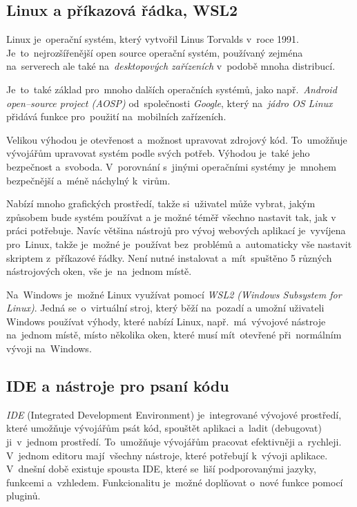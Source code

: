 \documentclass[10pt,a4paper]{article}
\begin{document}
        \subsection{Linux a příkazová řádka, WSL2}
        Linux je~operační systém, který vytvořil Linus Torvalds v~roce 1991. Je~to~nejrozšířenější open source operační systém, používaný zejména na~serverech ale také na~\emph{desktopových zařízeních} v~podobě mnoha distribucí.
        
        Je~to~také základ pro~mnoho dalších operačních systémů, jako např.~\emph{Android open--source project (\emph{AOSP})} od~společnosti \emph{Google}, který na~\emph{jádro OS Linux} přidává funkce pro~použití na~mobilních zařízeních. \cite{AOSP:linux}
        
        Velikou výhodou je otevřenost a~možnost upravovat zdrojový kód. To~umožňuje vývojářům upravovat systém podle svých potřeb. Výhodou je~také jeho bezpečnost a~svoboda. V~porovnání s~jinými operačními systémy je~mnohem bezpečnější a~méně náchylný k~virům. \cite{medium:LinuxSecure}

        Nabízí mnoho grafických prostředí, takže si~uživatel může vybrat, jakým způsobem bude systém používat a je možné téměř
        všechno nastavit tak, jak v práci potřebuje. Navíc většina nástrojů pro vývoj webových aplikací je~vyvíjena pro~Linux, takže je~možné je~používat bez~problémů a~automaticky vše nastavit skriptem z~příkazové řádky. Není nutné instalovat a~mít~spuštěno 5 různých nástrojových oken, vše je~na~jednom místě.

        Na~Windows je~možné Linux využívat pomocí \emph{WSL2 (Windows Subsystem for Linux)}. Jedná se~o~virtuální stroj, který běží na~pozadí a umožní uživateli Windows používat výhody, které nabízí Linux, např.~má~vývojové nástroje na~jednom místě, místo několika oken, které musí mít~otevřené při~normálním vývoji na~Windows.

        \subsection{IDE a nástroje pro psaní kódu}
        \emph{IDE} (Integrated Development Environment) je~integrované vývojové prostředí, které umožňuje vývojářům psát kód, spouštět aplikaci a~ladit (debugovat) ji~v~jednom prostředí. To~umožňuje vývojářům pracovat efektivněji a~rychleji. V~jednom editoru mají~všechny nástroje, které potřebují k~vývoji aplikace. V~dnešní době existuje spousta IDE, které se~liší podporovanými jazyky, funkcemi a~vzhledem. Funkcionalitu je~možné doplňovat o~nové funkce pomocí pluginů.
        
\end{document}

